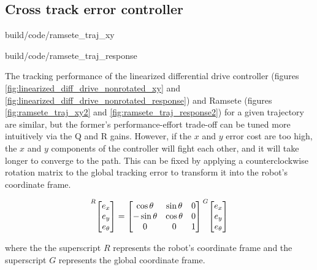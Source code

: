 \subsection{Cross track error controller}

\begin{bookfigure}
  \begin{minisvg}{build/code/ramsete_traj_xy}
    \caption{Ramsete nonlinear controller x-y plot}
    \label{fig:ramsete_traj_xy2}
  \end{minisvg}
  \hfill
  \begin{minisvg}{build/code/ramsete_traj_response}
    \caption{Ramsete nonlinear controller response}
    \label{fig:ramsete_traj_response2}
  \end{minisvg}
\end{bookfigure}

The tracking performance of the linearized differential drive controller
(figures \ref{fig:linearized_diff_drive_nonrotated_xy} and
\ref{fig:linearized_diff_drive_nonrotated_response}) and Ramsete (figures
\ref{fig:ramsete_traj_xy2} and \ref{fig:ramsete_traj_response2}) for a given
trajectory are similar, but the former's performance-effort trade-off can be
tuned more intuitively via the Q and R gains. However, if the $x$ and $y$ error
cost are too high, the $x$ and $y$ components of the controller will fight each
other, and it will take longer to converge to the path. This can be fixed by
applying a counterclockwise rotation matrix to the global tracking error to
transform it into the robot's coordinate frame.

\begin{equation*}
  \prescript{R}{}{\begin{bmatrix}
    e_x \\
    e_y \\
    e_\theta
  \end{bmatrix}} =
  \begin{bmatrix}
    \cos\theta & \sin\theta & 0 \\
    -\sin\theta & \cos\theta & 0 \\
    0 & 0 & 1
  \end{bmatrix}
  \prescript{G}{}{\begin{bmatrix}
    e_x \\
    e_y \\
    e_\theta
  \end{bmatrix}}
\end{equation*}

where the the superscript $R$ represents the robot's coordinate frame and the
superscript $G$ represents the global coordinate frame.

